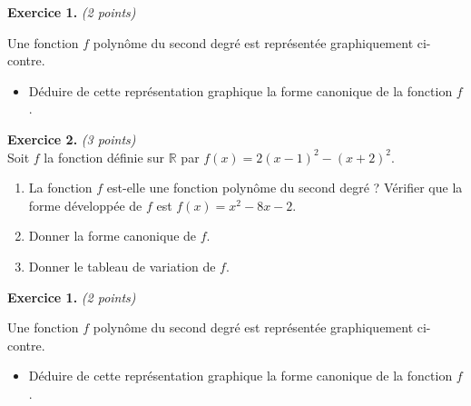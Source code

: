 \documentclass[11pt]{article}
\begin{document}

\noindent\textbf{Exercice 1.} \hspace{.5cm}\emph{(2 points)}\\
  \begin{minipage}{.47\textwidth}
  Une fonction $f$ polynôme du second degré est représentée graphiquement
  ci-contre.
 \begin{itemize}
    \item Déduire de cette représentation graphique la forme canonique de la
      fonction $f$.
  \end{itemize}
\end{minipage}
\begin{minipage}{.47\textwidth}
  \begin{center}
\end{center}
\end{minipage}

\noindent\textbf{Exercice 2.} \hspace{.5cm}\emph{(3 points)}\\
Soit $f$ la fonction définie sur $\mathbb{R}$ par $f(x)=2(x-1)^2-(x+2)^2$.
\begin{enumerate}
  \item La fonction $f$ est-elle une fonction polynôme du second degré ?
    Vérifier que la forme développée de $f$ est $f(x) = x^2-8x-2$.
  \item Donner la forme canonique de $f$.
  \item Donner le tableau de variation de $f$.
\end{enumerate}
\vspace{4cm}
\noindent\textbf{Exercice 1.} \hspace{.5cm}\emph{(2 points)}\\
  \begin{minipage}{.47\textwidth}
  Une fonction $f$ polynôme du second degré est représentée graphiquement
  ci-contre.
 \begin{itemize}
    \item Déduire de cette représentation graphique la forme canonique de la
      fonction $f$.
  \end{itemize}
\end{minipage}
\begin{minipage}{.47\textwidth}
  \begin{center}
\end{center}
\end{minipage}
\end{document}
